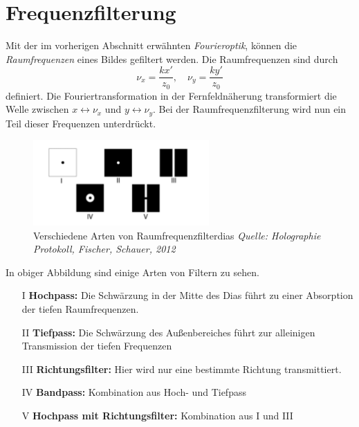     \section{Frequenzfilterung}
Mit der im vorherigen Abschnitt erwähnten \emph{Fourieroptik}, können die 
\emph{Raumfrequenzen} eines Bildes gefiltert werden. Die Raumfrequenzen sind durch
\[
    \nu_x = \frac{kx'}{z_0}, \quad \nu_y = \frac{ky'}{z_0}
\]
definiert. Die Fouriertransformation in der Fernfeldnäherung transformiert die 
Welle zwischen $x \leftrightarrow \nu_x$ und $y \leftrightarrow \nu_y$.
Bei der Raumfrequenzfilterung wird nun ein Teil dieser Frequenzen 
unterdrückt. 
    \begin{figure}[H]
        \centering
        \includegraphics[width=0.6\textwidth]{Abb/filter.PNG}
        \caption{Verschiedene Arten von Raumfrequenzfilterdias
                 \textit{Quelle: Holographie Protokoll, Fischer, Schauer, 2012}
                }
        \label{filter}
    \end{figure}
In obiger Abbildung sind einige Arten von Filtern zu sehen.
    \begin{itemize}
        \item[I] \textbf{Hochpass:} Die Schwärzung in der Mitte des Dias 
        führt zu einer Absorption der tiefen Raumfrequenzen.
        \item[II] \textbf{Tiefpass:} Die Schwärzung des Außenbereiches
        führt zur alleinigen Transmission der tiefen Frequenzen
        \item[III] \textbf{Richtungsfilter:} Hier wird nur eine bestimmte
        Richtung transmittiert.
        \item[IV] \textbf{Bandpass:} Kombination aus Hoch- und Tiefpass
        \item[V] \textbf{Hochpass mit Richtungsfilter:} Kombination aus I und III
    \end{itemize}

